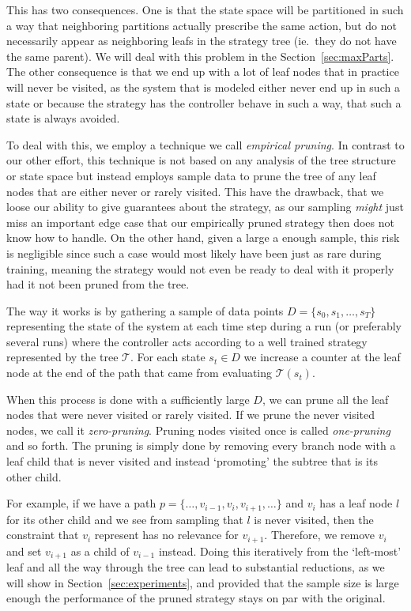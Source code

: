 This has two consequences. One is that the state space will be partitioned in
such a way that neighboring partitions actually prescribe the same action, but
do not necessarily appear as neighboring leafs in the strategy tree (ie.\ they
do not have the same parent). We will deal with this problem in the
Section~\ref{sec:maxParts}. The other consequence is that we end up with a lot
of leaf nodes that in practice will never be visited, as the system that is
modeled either never end up in such a state or because the strategy has the
controller behave in such a way, that such a state is always avoided.

To deal with this, we employ a technique we call \textit{empirical pruning}. In
contrast to our other effort, this technique is not based on any analysis of the
tree structure or state space but instead employs sample data to prune the tree
of any leaf nodes that are either never or rarely visited. This have the
drawback, that we loose our ability to give guarantees about the strategy, as our
sampling \textit{might} just miss an important edge case that our empirically
pruned strategy then does not know how to handle. On the other hand, given a
large a enough sample, this risk is negligible since such a case would most
likely have been just as rare during training, meaning the strategy would not
even be ready to deal with it properly had it not been pruned from the tree.

The way it works is by gathering a sample of data points $D = \{ s_0, s_1,
\ldots, s_T\}$ representing the state of the system at each time step during a
run (or preferably several runs) where the controller acts according to a well
trained strategy represented by the tree $\mathcal{T}$. For each state $s_t \in
D$ we increase a counter at the leaf node at the end of the path that came from
evaluating $\mathcal{T}(s_t)$.

When this process is done with a sufficiently large $D$, we can prune all the
leaf nodes that were never visited or rarely visited. If we prune the never
visited nodes, we call it \textit{zero-pruning}. Pruning nodes visited once is
called \textit{one-pruning} and so forth. The pruning is simply done by removing
every branch node with a leaf child that is never visited and instead
`promoting' the subtree that is its other child.

For example, if we have a path $p = \{ \ldots, v_{i-1}, v_i, v_{i+1}, \ldots \}$
and $v_i$ has a leaf node $l$ for its other child and we see from sampling that
$l$ is never visited, then the constraint that $v_i$ represent has no relevance
for $v_{i+1}$. Therefore, we remove $v_i$ and set $v_{i+1}$ as a child of
$v_{i-1}$ instead. Doing this iteratively from the `left-most' leaf and all the
way through the tree can lead to substantial reductions, as we will show in
Section~\ref{sec:experiments}, and provided that the sample size is large enough
the performance of the pruned strategy stays on par with the original.

